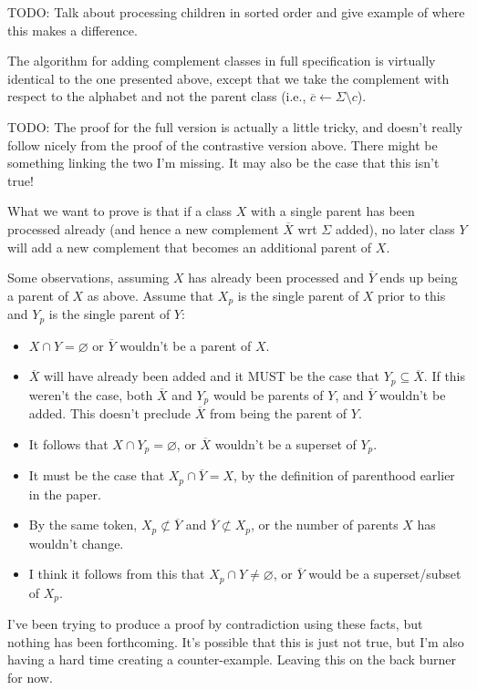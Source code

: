 \documentclass[11pt, oneside]{article}   	%
\begin{document}
TODO: Talk about processing children in sorted order and give example of where this makes a difference.

The algorithm for adding complement classes in full specification is virtually identical to the one presented above, except that we take the complement with respect to the alphabet and not the parent class (i.e., $\overline{c} \leftarrow \Sigma \setminus c$). 

TODO: The proof for the full version is actually a little tricky, and doesn't really follow nicely from the proof of the contrastive version above. There might be something linking the two I'm missing. It may also be the case that this isn't true!

What we want to prove is that if a class $X$ with a single parent has been processed already (and hence a new complement $\overline{X}$ wrt $\Sigma$ added), no later class $Y$ will add a new complement that becomes an additional parent of $X$.

Some observations, assuming $X$ has already been processed and $\overline{Y}$ ends up being a parent of $X$ as above. Assume that $X_p$ is the single parent of $X$ prior to this and $Y_p$ is the single parent of $Y$:
\begin{itemize}
	\item $X \cap Y = \varnothing$ or $\overline{Y}$ wouldn't be a parent of $X$.
	\item $\overline{X}$ will have already been added and it MUST be the case that $Y_p \subseteq \overline{X}$. If this weren't the case, both $\overline{X}$ and $Y_p$ would be parents of $Y$, and $\overline{Y}$ wouldn't be added. This doesn't preclude $\overline{X}$ from being the parent of $Y$. 
	\item It follows that $X \cap Y_p = \varnothing$, or $\overline{X}$ wouldn't be a superset of $Y_p$. 
	\item It must be the case that $X_p \cap \overline{Y} = X$, by the definition of parenthood earlier in the paper.
	\item By the same token, $X_p \not \subset \overline{Y}$ and $\overline{Y} \not \subset X_p$, or the number of parents $X$ has wouldn't change.
	\item I think it follows from this that $X_p \cap Y \neq \varnothing$, or $\overline{Y}$ would be a superset/subset of $X_p$.
\end{itemize}

I've been trying to produce a proof by contradiction using these facts, but nothing has been forthcoming. It's possible that this is just not true, but I'm also having a hard time creating a counter-example. Leaving this on the back burner for now.



\end{document}

